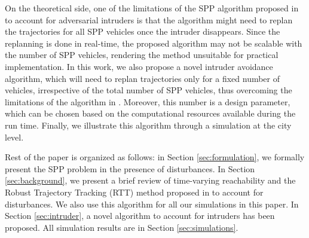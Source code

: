 On the theoretical side, one of the limitations of the SPP algorithm proposed in \cite{chen2016robust} to account for adversarial intruders is that the algorithm might need to replan the trajectories for all SPP vehicles once the intruder disappears. Since the replanning is done in real-time, the proposed algorithm may not be scalable with the number of SPP vehicles, rendering the method unsuitable for practical implementation. In this work, we also propose a novel intruder avoidance algorithm, which will need to replan trajectories only for a fixed number of vehicles, irrespective of the total number of SPP vehicles, thus overcoming the limitations of the algorithm in \cite{chen2016robust}. Moreover, this number is a design parameter, which can be chosen based on the computational resources available during the run time. Finally, we illustrate this algorithm through a simulation at the city level.

Rest of the paper is organized as follows: in Section \ref{sec:formulation}, we formally present the SPP problem in the presence of disturbances. In Section \ref{sec:background}, we present a brief review of time-varying reachability and the Robust Trajectory Tracking (RTT) method proposed in \cite{Bansal2017} to account for disturbances. We also use this algorithm for all our simulations in this paper. In Section \ref{sec:intruder}, a novel algorithm to account for intruders has been proposed. All simulation results are in Section \ref{sec:simulations}.